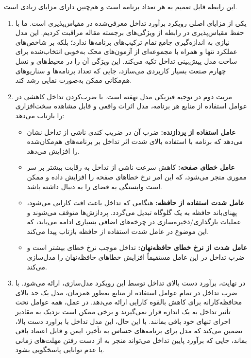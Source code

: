 این رابطه قابل تعمیم به هر تعداد برنامه است و هم‌چنین دارای مزایای زیادی است. 

\begin{enumerate}
\item
یکی از مزایای اصلی رویکرد برآورد تداخل معرفی‌شده در \cite{medel2023modeling} مقیاس‌پذیری است. ما با حفظ مقیاس‌پذیری در رابطه از ویژگی‌های برجسته مقاله مراقبت کردیم. این مدل نیازی به اندازه‌گیری جامع تمام ترکیب‌های برنامه‌ها ندارد؛ بلکه بر شاخص‌های عملکرد تنها و همراه با مجموعه‌ای از آزمون‌های محک به‌خوبی انتخاب‌شده برای ساخت مدل پیش‌بینی تداخل تکیه می‌کند. این ویژگی آن را در محیط‌های  و نسل چهارم صنعت بسیار کاربردی می‌سازد، جایی که تعداد برنامه‌ها و سناریوهای هم‌مکانی ممکن به‌صورت نمایی رشد کند.
\item
مزیت دوم در توجیه فیزیکی مدل نهفته است. با ضرب‌کردن تداخل کاهشی در عوامل استفاده از منابع هر برنامه، مدل اثرات واقعی و قابل مشاهده سخت‌افزاری را بازتاب می‌دهد:

\begin{itemize}
\item
\textbf{عامل استفاده از پردازنده:} ضرب آن در ضریب کندی ناشی از تداخل نشان می‌دهد که برنامه با استفاده بالای  شدت اثر تداخل بر برنامه‌های هم‌مکان‌شده را افزایش می‌دهد.
\item
\textbf{عامل خطای صفحه:} کاهش سرعت ناشی از تداخل به رقابت بیشتر بر سر مموری منجر می‌شود، که این امر نرخ خطاهای صفحه را افزایش داده و ممکن است وابستگی به فضای  را به دنبال داشته باشد.
\item
\textbf{عامل شدت استفاده از حافظه:} هنگامی که تداخل باعث افت کارایی می‌شود، پهنای‌باند حافظه به یک گلوگاه تبدیل می‌گردد. پردازش‌ها متوقف می‌شوند و عملیات بارگذاری/ذخیره‌سازی در چرخه‌های اضافی بسیاری ادامه می‌یابد، که این موضوع در عامل شدت استفاده از حافظه بازتاب پیدا می‌کند.
\item
\textbf{عامل شدت از نرخ خطای حافظه‌نهان:} تداخل موجب نرخ خطای بیشتر است و ضرب تداخل در این عامل مستقیماً افزایش خطاهای حافظه‌نهان را مدل‌سازی می‌کند.
\end{itemize}

\item
در نهایت، برآورد دست بالای تداخل توسط این رویکرد مدل‌سازی، ارائه می‌شود. با ضرب تداخل در تمام عوامل استفاده از منابع به‌طور همزمان، مدل یک حد بالای محافظه‌کارانه برای کاهش بالقوه کارایی ارائه می‌دهد. در عمل، همه عوامل تحت تأثیر تداخل به یک اندازه قرار نمی‌گیرند و برخی ممکن است نزدیک به مقادیر اجرای تنهای خود باقی بمانند. با این حال، این مدل تداخل با براورد دست بالا، تضمین می‌کند که مدل برای برنامه‌های حساس به تأخیر، ایمن و قابل اعتماد باقی بماند، جایی که برآورد پایین تداخل می‌تواند منجر به از دست رفتن مهلت‌های زمانی یا عدم توانایی پاسخگویی بشود.
\end{enumerate}


